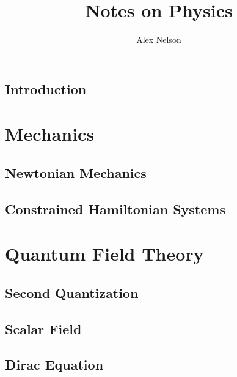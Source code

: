 \documentclass[graybox,envcountchap,sectrefs,vecphys,nospthms]{svmono}
\begin{document}
\frontmatter%

\hypersetup{pageanchor=false}
\title{Notes on Physics}
\author{Alex Nelson}
\maketitle

\preface %
\hypersetup{pageanchor=true}


\tableofcontents

\mainmatter%
\chapter{Introduction}


\part{Mechanics}
\chapter{Newtonian Mechanics}



\chapter{Constrained Hamiltonian Systems}


\part{Quantum Field Theory}
\chapter{Second Quantization}

\chapter{Scalar Field}

\chapter{Dirac Equation}


\backmatter%
\printbibliography[heading=bibintoc]
\printindex
\end{document}
